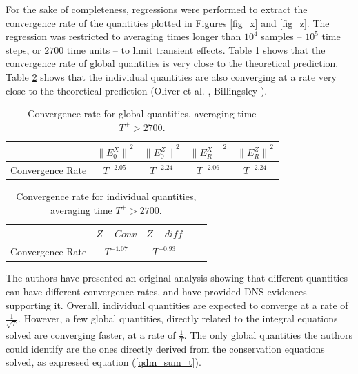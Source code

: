 \documentclass[aip,pof,reprint]{revtex4-1}
\begin{document}
For the sake of completeness, regressions were performed to extract the convergence rate of the quantities plotted in Figures \ref{fig_x} and \ref{fig_z}.
The regression was restricted to averaging times longer than $10^4$ samples -- $10^5$ time steps, or $2700$ time units -- to limit transient effects.
Table \ref{tab_conv_rate} shows that the convergence rate of global quantities is very close to the theoretical prediction.
Table \ref{tab_conv_rate_2} shows that the individual quantities are also converging at a rate very close to the theoretical prediction (Oliver et al. \cite{oliver}, Billingsley \cite{billingsley2008probability}).

\begin{table}
\caption{\label{tab_conv_rate}Convergence rate for global quantities, averaging time $T^+>2700$.}
\begin{ruledtabular}
\begin{tabular}{rcccc}
 & ${\parallel{E_0^X}\parallel}^2$ & ${\parallel{E_0^Z}\parallel}^2$ & ${\parallel{E_R^X}\parallel}^2$ & ${\parallel{E_R^Z}\parallel}^2$ \\
\hline
Convergence Rate & $T^{-2.05}$ & $T^{-2.24}$ & $T^{-2.06}$ & $T^{-2.24}$ \\
\end{tabular}
\end{ruledtabular}
\end{table}

\begin{table}
\caption{\label{tab_conv_rate_2}Convergence rate for individual quantities, averaging time $T^+>2700$.}
\begin{ruledtabular}
\begin{tabular}{rcccc}
 & $Z-Conv$ & $Z-diff$ \\
\hline
Convergence Rate & $T^{-1.07}$ & $T^{-0.93}$ \\
\end{tabular}
\end{ruledtabular}
\end{table}

The authors have presented an original analysis showing that different quantities can have different convergence rates, and have provided DNS evidences supporting it.
Overall, individual quantities are expected to converge at a rate of $\frac{1}{\sqrt{T}}$.
However, a few global quantities, directly related to the integral equations solved are converging faster, at a rate of $\frac{1}{T}$.
The only global quantities the authors could identify are the ones directly derived from the conservation equations solved, as expressed equation (\ref{qdm_sum_t}).
\end{document}
